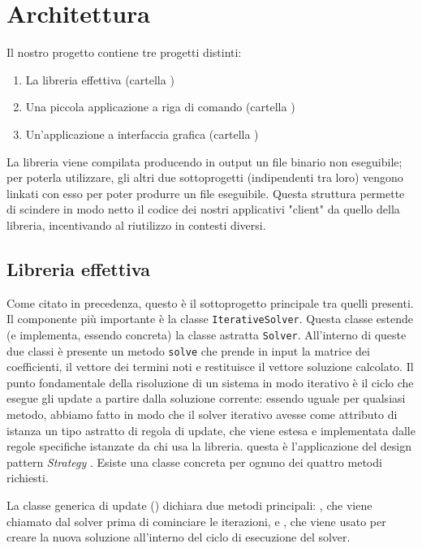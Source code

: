 \section{Architettura}

Il nostro progetto contiene tre progetti distinti:

\begin{enumerate}
	\item La libreria effettiva (cartella )
	\item Una piccola applicazione a riga di comando (cartella )
	\item Un'applicazione a interfaccia grafica (cartella )
\end{enumerate}

La libreria viene compilata producendo in output un file binario non eseguibile; per poterla utilizzare, gli altri due sottoprogetti (indipendenti tra loro) vengono linkati con esso per poter produrre un file eseguibile. Questa struttura permette di scindere in modo netto il codice dei nostri applicativi "client" da quello della libreria, incentivando al riutilizzo in contesti diversi.

\subsection{Libreria effettiva}
Come citato in precedenza, questo è il sottoprogetto principale tra quelli presenti. Il componente più importante è la classe \texttt{IterativeSolver}. Questa classe estende (e implementa, essendo concreta) la classe astratta \texttt{Solver}. All'interno di queste due classi  è presente un metodo \texttt{solve} che prende in input la matrice dei coefficienti, il vettore dei termini noti e restituisce il vettore soluzione calcolato. Il punto fondamentale della risoluzione di un sistema in modo iterativo è il ciclo che esegue gli update a partire dalla soluzione corrente: essendo uguale per qualsiasi metodo, abbiamo fatto in modo che il solver iterativo avesse come attributo di istanza un tipo astratto di regola di update, che viene estesa e implementata dalle regole specifiche istanzate da chi usa la libreria. questa è l'applicazione del design pattern \textit{Strategy} \cite{Strategy}. Esiste una classe concreta per ognuno dei quattro metodi richiesti.

La classe generica di update () dichiara due metodi principali: , che viene chiamato dal solver prima di cominciare le iterazioni, e , che viene usato per creare la nuova soluzione all'interno del ciclo di esecuzione del solver.


